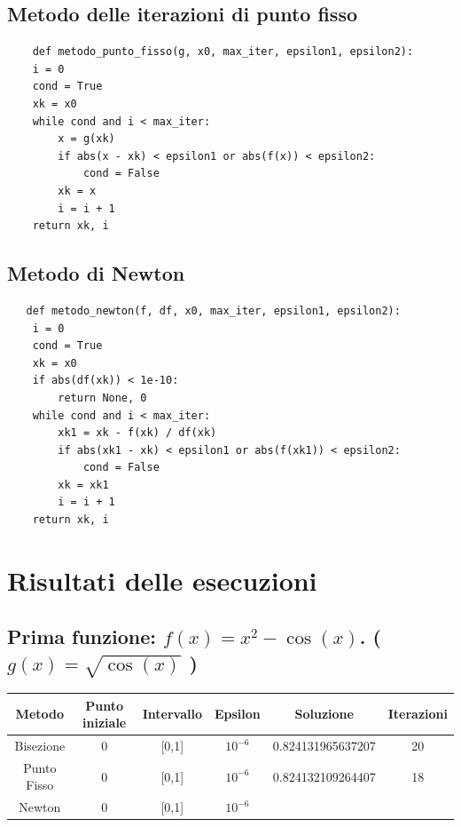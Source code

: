 \documentclass[11pt,a4paper]{article}
\begin{document}
\bigskip
\bigskip
\bigskip
\bigskip


\subsection*{Metodo delle iterazioni di punto fisso}

\begin{verbatim}
    def metodo_punto_fisso(g, x0, max_iter, epsilon1, epsilon2):
    i = 0
    cond = True
    xk = x0
    while cond and i < max_iter:
        x = g(xk)
        if abs(x - xk) < epsilon1 or abs(f(x)) < epsilon2:
            cond = False
        xk = x
        i = i + 1
    return xk, i
\end{verbatim}


\subsection*{Metodo di Newton}

\begin{verbatim}
   def metodo_newton(f, df, x0, max_iter, epsilon1, epsilon2):
    i = 0
    cond = True
    xk = x0
    if abs(df(xk)) < 1e-10:
        return None, 0
    while cond and i < max_iter:
        xk1 = xk - f(xk) / df(xk)
        if abs(xk1 - xk) < epsilon1 or abs(f(xk1)) < epsilon2:
            cond = False
        xk = xk1
        i = i + 1
    return xk, i
\end{verbatim}

\bigskip
\bigskip

\section*{Risultati delle esecuzioni}
\subsection*{Prima funzione:  \(f(x)=x^{2}-\cos(x)\). \quad ( \(g(x)=\sqrt{\cos(x)}\) )}


\begin{table}[h!]
\centering
\begin{tabular}{|c|c|c|c|c|c|}
\hline
\textbf{Metodo} & \textbf{Punto iniziale} & \textbf{Intervallo} & \textbf{Epsilon} & \textbf{Soluzione} & \textbf{Iterazioni}  \\ \hline
 Bisezione   & 0   &  [0,1]  & \(10^{-6}\) & 0.824131965637207 & 20   \\ \hline
 Punto Fisso & 0   &  [0,1]  & \(10^{-6}\) & 0.824132109264407 & 18   \\ \hline
 Newton      & 0   &  [0,1]  & \(10^{-6}\) &  &     \\ \hline
\end{tabular}
\end{table}
\end{document}
